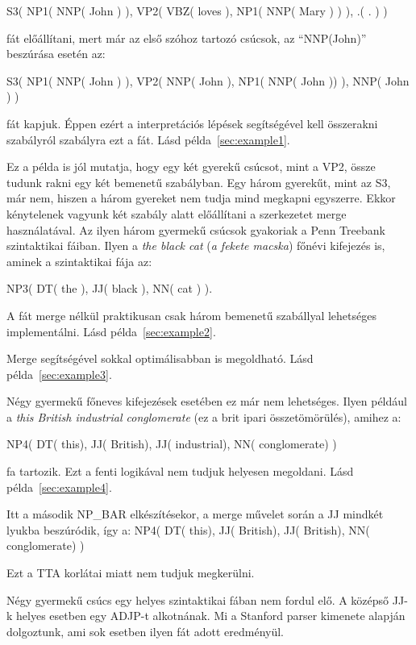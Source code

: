 S3( NP1( NNP( John ) ), VP2( VBZ( loves ),  NP1( NNP( Mary ) ) ), .( . ) )

fát előállítani, mert már az első szóhoz tartozó csúcsok, az “NNP(John)” beszúrása esetén az:

S3( NP1( NNP( John ) ), VP2( NNP( John ),  NP1( NNP( John )) ), NNP( John ) )

fát kapjuk. 
Éppen ezért a interpretációs lépések segítségével kell összerakni szabályról szabályra ezt a fát. 
Lásd példa~\ref{sec:example1}.

Ez a példa is jól mutatja, hogy egy két gyerekű csúcsot, mint a VP2, össze tudunk rakni egy két bemenetű szabályban. Egy három gyerekűt, mint az S3, már nem, hiszen a három gyereket nem tudja mind megkapni egyszerre. Ekkor kénytelenek vagyunk két szabály alatt előállítani a szerkezetet merge használatával. Az ilyen három gyermekű csúcsok gyakoriak a Penn Treebank szintaktikai fáiban.  Ilyen a \textit{the black cat} (\textit{a fekete macska}) főnévi kifejezés is, aminek a szintaktikai fája az:

NP3( DT( the ), JJ( black ), NN( cat ) ).

A fát merge nélkül praktikusan csak három bemenetű szabállyal lehetséges implementálni.
Lásd példa~\ref{sec:example2}.

Merge segítségével sokkal optimálisabban is megoldható. Lásd példa~\ref{sec:example3}.

Négy gyermekű főneves kifejezések esetében ez már nem lehetséges. 
Ilyen például a \textit{this British industrial conglomerate} (ez a brit ipari összetömörülés), amihez  a:

NP4( DT( this), JJ( British), JJ( industrial), NN( conglomerate) )

fa tartozik. Ezt a fenti logikával nem tudjuk helyesen megoldani. Lásd példa~\ref{sec:example4}.

Itt a második NP\_BAR elkészítésekor, a merge művelet során a JJ  mindkét lyukba beszúródik, így a: NP4( DT( this), JJ( British), JJ( British), NN( conglomerate) )

Ezt a TTA korlátai miatt nem tudjuk megkerülni.

Négy gyermekű csúcs egy helyes szintaktikai fában nem fordul elő. A középső JJ-k helyes esetben egy ADJP-t alkotnának. Mi a Stanford parser kimenete alapján dolgoztunk, ami sok esetben ilyen fát adott eredményül.



